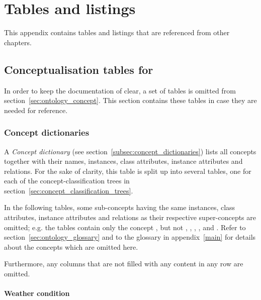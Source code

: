 
\chapter{Tables and listings}
\label{ch:listings}

This appendix contains tables and listings that are referenced from other chapters.

\section{Conceptualisation tables for \thinkhomeweather}
\label{sec:appendix_conceptualisation}

In order to keep the documentation of \thinkhomeweather clear, a set of tables is omitted from section~\ref{sec:ontology_concept}. This section contains these tables in case they are needed for reference.

\subsection{Concept dictionaries}
\label{subsec:appendix_concept_dictionaries}

A \emph{Concept dictionary} (see section~\ref{subsec:concept_dictionaries}) lists all concepts together with their names, instances, class attributes, instance attributes and relations. For the sake of clarity, this table is split up into several tables, one for each of the concept-classification trees in section~\ref{sec:concept_classification_trees}.

In the following tables, some sub-concepts having the same instances, class attributes, instance attributes and relations as their respective super-concepts are omitted; e.g. the tables contain only the concept , but not , , , , and . Refer to section~\ref{sec:ontology_glossary} and to the glossary in appendix~\ref{main} for details about the concepts which are omitted here.

Furthermore, any columns that are not filled with any content in any row are omitted.

\subsubsection{Weather condition}

